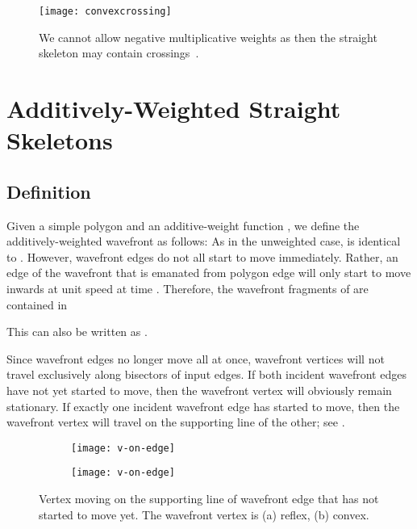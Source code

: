 \documentclass[preprint]{elsarticle}
\begin{document}
\begin{figure}[htb!]
  \centering
  \texttt{[image: convexcrossing]}
    \caption{We cannot allow negative multiplicative weights as then the straight
      skeleton may contain crossings~\cite{Bie&15a}.
     }
  \label{fig:convexcrossing}
\end{figure}


\section{Additively-Weighted Straight Skeletons}

\subsection{Definition}

Given a simple polygon  and an additive-weight function
, we define the additively-weighted wavefront
 as follows: As in the unweighted case, 
is identical to .
However, wavefront edges do not all start to move immediately. Rather,
an edge of the wavefront that is emanated from polygon edge 
will only start to move inwards at unit speed at time .
Therefore, the wavefront fragments  of  are contained in

This can also be written as .

Since wavefront edges no longer move all at once, wavefront vertices will not
travel exclusively along bisectors of input edges.  If both incident wavefront
edges have not yet started to move, then the wavefront vertex will obviously
remain stationary.  If exactly one incident wavefront edge has started to move,
then the wavefront vertex will travel on the supporting line of the other;
see .

\begin{figure}[htb!]
  \centering
  \begin{subfigure}[b]{0.30\textwidth}
    \centering
    \texttt{[image: v-on-edge]}
    \caption[]{}
    \label{fig:v-on-edge:a}
  \end{subfigure}
  \hspace{0.1em}
  \begin{subfigure}[b]{0.30\textwidth}
    \centering
    \texttt{[image: v-on-edge]}
    \caption[]{}
    \label{fig:v-on-edge:convex}
  \end{subfigure}
  \caption{Vertex  moving on the supporting line of wavefront edge  that has not
    started to move yet.  The wavefront vertex  is (a) reflex, (b) convex.
  }
  \label{fig:v-on-edge}
\end{figure}
\end{document}
